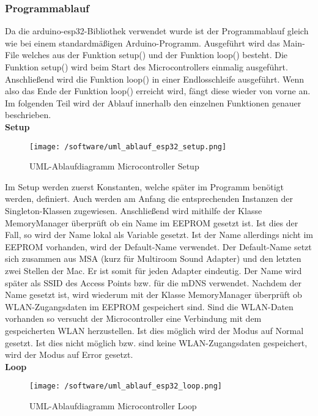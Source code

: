 \documentclass[11pt, twoside]{article}
\begin{document}
\subsubsection{Programmablauf}
Da die arduino-esp32-Bibliothek verwendet wurde ist der Programmablauf gleich wie bei einem standardmäßigen Arduino-Programm. Ausgeführt wird das Main-File welches aus der Funktion setup() und der Funktion loop() besteht. Die Funktion setup() wird beim Start des Microcontrollers einmalig ausgeführt. Anschließend wird die Funktion loop() in einer Endlosschleife ausgeführt. Wenn also das Ende der Funktion loop() erreicht wird, fängt diese wieder von vorne an. Im folgenden Teil wird der Ablauf innerhalb den einzelnen Funktionen genauer beschrieben. \newline \\
\textbf{Setup} \\
\begin{figure}[H]
\texttt{[image: /software/uml\_ablauf\_esp32\_setup.png]}
\caption{UML-Ablaufdiagramm Microcontroller Setup}
\end{figure}
Im Setup werden zuerst Konstanten, welche später im Programm benötigt werden, definiert. Auch werden am Anfang die entsprechenden Instanzen der Singleton-Klassen zugewiesen. Anschließend wird mithilfe der Klasse MemoryManager überprüft ob ein Name im EEPROM gesetzt ist. Ist dies der Fall, so wird der Name lokal als Variable gesetzt. Ist der Name allerdings nicht im EEPROM vorhanden, wird der Default-Name verwendet. Der Default-Name setzt sich zusammen aus MSA (kurz für Multiroom Sound Adapter) und den letzten zwei Stellen der Mac. Er ist somit für jeden Adapter eindeutig. Der Name wird später als SSID des Access Points bzw. für die mDNS verwendet. Nachdem der Name gesetzt ist, wird wiederum mit der Klasse MemoryManager überprüft ob WLAN-Zugangsdaten im EEPROM gespeichert sind. Sind die WLAN-Daten vorhanden so versucht der Microcontroller eine Verbindung mit dem gespeicherten WLAN herzustellen. Ist dies möglich wird der Modus auf Normal gesetzt. Ist dies nicht möglich bzw. sind keine WLAN-Zugangsdaten gespeichert, wird der Modus auf Error gesetzt. \newline \\
\textbf{Loop} \\
\begin{figure}[H]
\texttt{[image: /software/uml\_ablauf\_esp32\_loop.png]}
\caption{UML-Ablaufdiagramm Microcontroller Loop}
\end{figure}
\end{document}
